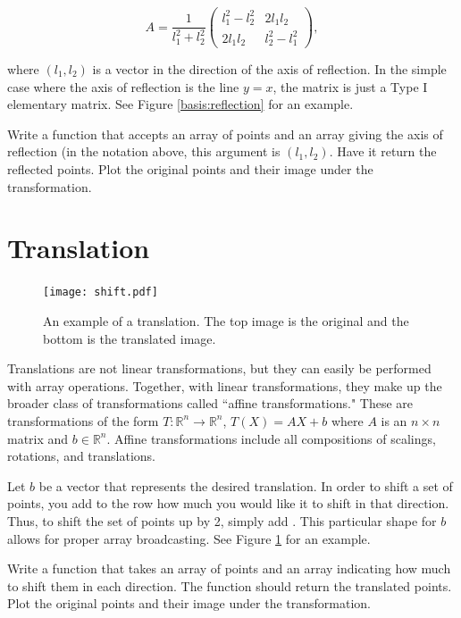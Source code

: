 \[
A = \frac{1}{l_1^2 + l_2^2}
\begin{pmatrix}
l_1^2 - l_2^2 & 2l_1l_2 \\
2l_1l_2 & l_2^2 - l_1^2
\end{pmatrix},
\]

where $(l_1, l_2)$ is a vector in the direction of the axis of reflection. In the simple case where the axis of reflection is the line $y=x$, the matrix is just a Type I elementary matrix. See Figure \ref{basis:reflection} for an example.

\begin{problem}
Write a function that accepts an array of points and an array giving the axis of reflection (in the notation above, this argument is $(l_1, l_2)$. Have it return the reflected points.
Plot the original points and their image under the transformation.
\end{problem}

\section*{Translation}

\begin{figure}
\centering
\texttt{[image: shift.pdf]}
\caption{
An example of a translation.
The top image is the original and the bottom is the translated image.}
\label{basis:translation}
\end{figure}

Translations are not linear transformations, but they can easily be performed with array operations. Together, with linear transformations, they make up the broader class of transformations called
``affine transformations." These are transformations of the form $T: \mathbb{R}^n \to \mathbb{R}^n$, $T(X) = AX + b$ where $A$ is an $n\times n$ matrix and $b \in \mathbb{R}^n$. Affine transformations include all compositions of scalings, rotations, and translations.


Let $b$ be a vector that represents the desired translation.
In order to shift a set of points, you add to the row how much you would like it to shift in that direction. Thus, to shift the set of points up by 2, simply add . This particular shape for $b$ allows for proper array broadcasting.
See Figure \ref{basis:translation} for an example.

\begin{problem}
Write a function that takes an array of points and an array indicating how much to shift them in each direction. The function should return the translated points.
Plot the original points and their image under the transformation.
\end{problem}


